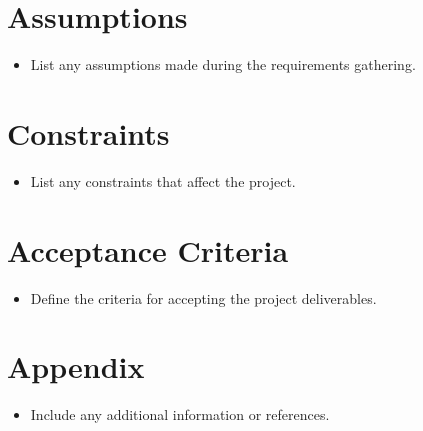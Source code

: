 \documentclass{article}
\begin{document}
\section*{Assumptions}
\begin{itemize}
    \item List any assumptions made during the requirements gathering.
\end{itemize}

\section*{Constraints}
\begin{itemize}
    \item List any constraints that affect the project.
\end{itemize}

\section*{Acceptance Criteria}
\begin{itemize}
    \item Define the criteria for accepting the project deliverables.
\end{itemize}

\section*{Appendix}
\begin{itemize}
    \item Include any additional information or references.
\end{itemize}
\end{document}
